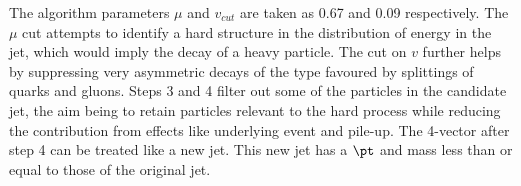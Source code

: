 \noindent The algorithm parameters $\mu$ and $v_{cut}$ are taken as 0.67 and 0.09 respectively.
The $\mu$ cut attempts to identify a hard structure in the distribution of energy in the jet, which would imply the decay of a heavy particle. The cut on $v$ further helps by suppressing very asymmetric decays of the type favoured by splittings of quarks and gluons.
Steps 3 and 4 filter out some of the particles in the candidate jet, the aim being to retain particles relevant to the hard process while reducing the contribution from effects like underlying event and pile-up. The 4-vector after step 4 can be treated like a new jet. This new jet has a $\pt$ and mass less than or equal to those of the original jet.

